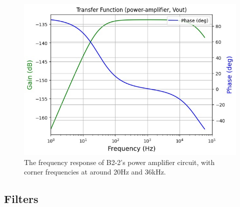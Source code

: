 \begin{figure}[H]
    \centering
    \includegraphics[width=0.75\linewidth]{TU Delft Booming Bass Project Report/figures/PowerAmplifier/Vout alternative design.jpg}
    \captionsetup{justification=raggedright, labelfont=bf}
    \caption{The frequency response of B2-2's power amplifier circuit, with corner frequencies at around 20Hz and 36kHz.}
    \label{fig: Alternative frequency response output}
\end{figure}

\subsection{Filters}
